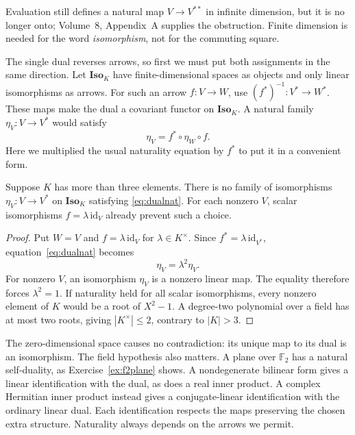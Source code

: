 Evaluation still defines a natural map $V\to V^{**}$ in infinite dimension, but it is no longer onto; Volume~8, Appendix~A supplies the obstruction. Finite dimension is needed for the word \emph{isomorphism}, not for the commuting square.

The single dual reverses arrows, so first we must put both assignments in the same direction. Let $\mathbf{Iso}_K$ have finite-dimensional spaces as objects and only linear isomorphisms as arrows. For such an arrow $f:V\to W$, use $(f^*)^{-1}:V^*\to W^*$. These maps make the dual a covariant functor on $\mathbf{Iso}_K$. A natural family $\eta_V:V\to V^*$ would satisfy
\begin{equation}\label{eq:dualnat}
\eta_V=f^*\circ\eta_W\circ f.
\end{equation}
Here we multiplied the usual naturality equation by $f^*$ to put it in a convenient form.

\begin{theorem}\label{thm:notnatural}
Suppose $K$ has more than three elements. There is no family of isomorphisms $\eta_V:V\to V^*$ on $\mathbf{Iso}_K$ satisfying \eqref{eq:dualnat}. For each nonzero $V$, scalar isomorphisms $f=\lambda\,\mathrm{id}_V$ already prevent such a choice.
\end{theorem}

\begin{proof}
Put $W=V$ and $f=\lambda\,\mathrm{id}_V$ for $\lambda\in K^\times$. Since $f^*=\lambda\,\mathrm{id}_{V^*}$, equation~\eqref{eq:dualnat} becomes
\[
\eta_V=\lambda^2\eta_V.
\]
For nonzero $V$, an isomorphism $\eta_V$ is a nonzero linear map. The equality therefore forces $\lambda^2=1$. If naturality held for all scalar isomorphisms, every nonzero element of $K$ would be a root of $X^2-1$. A degree-two polynomial over a field has at most two roots, giving $|K^\times|\le2$, contrary to $|K|>3$.
\end{proof}

The zero-dimensional space causes no contradiction: its unique map to its dual is an isomorphism. The field hypothesis also matters. A plane over $\mathbb F_2$ has a natural self-duality, as Exercise~\ref{ex:f2plane} shows. A nondegenerate bilinear form gives a linear identification with the dual, as does a real inner product. A complex Hermitian inner product instead gives a conjugate-linear identification with the ordinary linear dual. Each identification respects the maps preserving the chosen extra structure. Naturality always depends on the arrows we permit.

